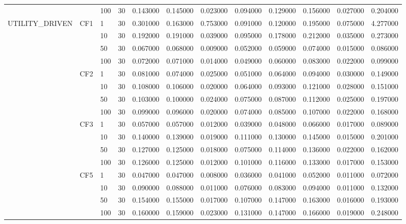 \begin{tabular}{lllrrrrrrrrr}
 &  & 100 & 30 & 0.143000 & 0.145000 & 0.023000 & 0.094000 & 0.129000 & 0.156000 & 0.027000 & 0.204000 \\
\cline{1-12} \cline{2-12}
\multirow[t]{16}{*}{UTILITY_DRIVEN} & \multirow[t]{4}{*}{CF1} & 1 & 30 & 0.301000 & 0.163000 & 0.753000 & 0.091000 & 0.120000 & 0.195000 & 0.075000 & 4.277000 \\
 &  & 10 & 30 & 0.192000 & 0.191000 & 0.039000 & 0.095000 & 0.178000 & 0.212000 & 0.035000 & 0.273000 \\
 &  & 50 & 30 & 0.067000 & 0.068000 & 0.009000 & 0.052000 & 0.059000 & 0.074000 & 0.015000 & 0.086000 \\
 &  & 100 & 30 & 0.072000 & 0.071000 & 0.014000 & 0.049000 & 0.060000 & 0.083000 & 0.022000 & 0.099000 \\
\cline{2-12}
 & \multirow[t]{4}{*}{CF2} & 1 & 30 & 0.081000 & 0.074000 & 0.025000 & 0.051000 & 0.064000 & 0.094000 & 0.030000 & 0.149000 \\
 &  & 10 & 30 & 0.108000 & 0.106000 & 0.020000 & 0.064000 & 0.093000 & 0.121000 & 0.028000 & 0.151000 \\
 &  & 50 & 30 & 0.103000 & 0.100000 & 0.024000 & 0.075000 & 0.087000 & 0.112000 & 0.025000 & 0.197000 \\
 &  & 100 & 30 & 0.099000 & 0.096000 & 0.020000 & 0.074000 & 0.085000 & 0.107000 & 0.022000 & 0.168000 \\
\cline{2-12}
 & \multirow[t]{4}{*}{CF3} & 1 & 30 & 0.057000 & 0.057000 & 0.012000 & 0.039000 & 0.048000 & 0.066000 & 0.017000 & 0.089000 \\
 &  & 10 & 30 & 0.140000 & 0.139000 & 0.019000 & 0.111000 & 0.130000 & 0.145000 & 0.015000 & 0.201000 \\
 &  & 50 & 30 & 0.127000 & 0.125000 & 0.018000 & 0.075000 & 0.114000 & 0.136000 & 0.022000 & 0.162000 \\
 &  & 100 & 30 & 0.126000 & 0.125000 & 0.012000 & 0.101000 & 0.116000 & 0.133000 & 0.017000 & 0.153000 \\
\cline{2-12}
 & \multirow[t]{4}{*}{CF5} & 1 & 30 & 0.047000 & 0.047000 & 0.008000 & 0.036000 & 0.041000 & 0.052000 & 0.011000 & 0.072000 \\
 &  & 10 & 30 & 0.090000 & 0.088000 & 0.011000 & 0.076000 & 0.083000 & 0.094000 & 0.011000 & 0.132000 \\
 &  & 50 & 30 & 0.154000 & 0.155000 & 0.017000 & 0.107000 & 0.147000 & 0.163000 & 0.016000 & 0.193000 \\
 &  & 100 & 30 & 0.160000 & 0.159000 & 0.023000 & 0.131000 & 0.147000 & 0.166000 & 0.019000 & 0.248000 \\

\end{tabular}
